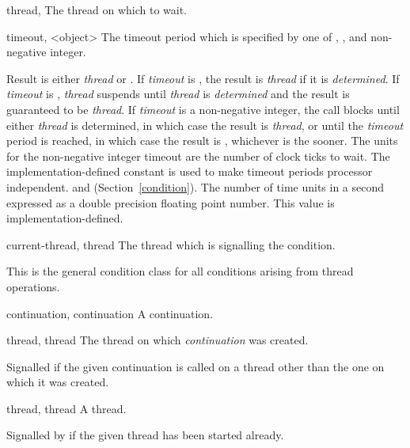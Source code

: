 \begin{optDefinition}
%
\begin{specargs}
%
    \item[thread, \classref{thread}] The thread on which to wait.
%
    \item[timeout, <object>] The timeout period which is specified by one of
    \nil, \true, and non-negative integer.
%
\end{specargs}
%
\result%
Result is either {\em thread} or \nil.  If {\em timeout} is \nil, the
result is {\em thread} if it is {\em determined}.  If {\em timeout} is \true,
{\em thread} suspends until {\em thread} is {\em determined} and the result is
guaranteed to be {\em thread}.  If {\em timeout} is a non-negative integer, the
call blocks until either {\em thread} is determined, in which case the result is
{\em thread}, or until the {\em timeout} period is reached, in which case the
result is \nil, whichever is the sooner.  The units for the non-negative integer
timeout are the number of clock ticks to wait.  The implementation-defined
constant  is used to make timeout periods processor
independent.
%
\seealso%
 and  (Section~\ref{condition}).
%
The number of time units in a second expressed as a double precision
floating point number.  This value is
implementation-defined.

%
\begin{initoptions}
    \item[current-thread, thread] The thread which is signalling the condition.
\end{initoptions}
%
\remarks%
This is the general condition class for all conditions arising from
thread operations.

%
\begin{initoptions}
%
    \item[continuation, continuation] A continuation.
%
    \item[thread, thread] The thread on which {\em continuation} was created.
%
\end{initoptions}
%
\remarks%
Signalled if the given continuation is called on a thread other than
the one on which it was created.

%
\begin{initoptions}
    \item[thread, thread] A thread.
\end{initoptions}
%
\remarks%
Signalled by  if the given thread has been started
already.


\end{optDefinition}
